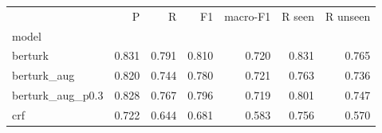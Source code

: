 \begin{tabular}{lrrrrrr}
\toprule
 & P & R & F1 & macro-F1 & R seen & R unseen \\
model &  &  &  &  &  &  \\
\midrule
berturk & 0.831 & 0.791 & 0.810 & 0.720 & 0.831 & 0.765 \\
berturk_aug & 0.820 & 0.744 & 0.780 & 0.721 & 0.763 & 0.736 \\
berturk_aug_p0.3 & 0.828 & 0.767 & 0.796 & 0.719 & 0.801 & 0.747 \\
crf & 0.722 & 0.644 & 0.681 & 0.583 & 0.756 & 0.570 \\
\bottomrule
\end{tabular}
